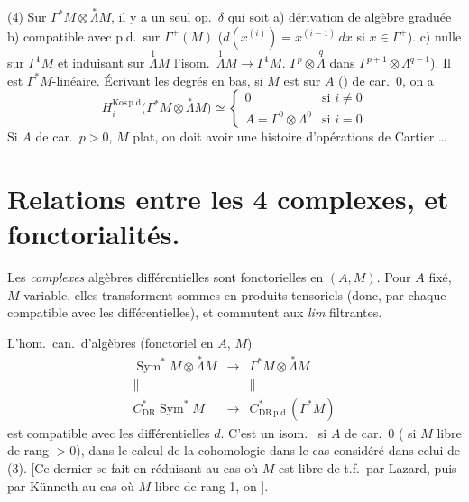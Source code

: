 \documentclass[11pt,a4paper]{article}
\begin{document}
(4) Sur $\Gamma^* M \otimes \overset{*}{\Lambda} M$, il y a un seul op.\ $\delta$ qui soit a) dérivation de algèbre graduée b) compatible avec p.d.\ sur $\Gamma^+(M)$ ($d(x^{(i)}) = x^{(i-1)}\, dx$ si $x \in \Gamma^+$). c) nulle sur $\Gamma^1 M$  et induisant sur $\overset{1}{\Lambda} M$ l'isom.\ $\overset{1}{\Lambda} M \to \Gamma^1 M$.    $\Gamma^p \otimes \overset{q}{\Lambda}$ dans $\Gamma^{p+1} \otimes \Lambda^{q-1}$). Il est $\Gamma^* M$-linéaire. Écrivant les degrés en bas, si $M$ est  \struck{\ill{}} sur $A$ () de car.\ $0$, on a
\[
  H_i^{\mathrm{Kos\,p.d}}\bigl( \Gamma^* M \otimes \overset{*}{\Lambda} M \bigr) \simeq
  \begin{cases}
    0 & \text{si } i \neq 0 \\
    A = \Gamma^0 \otimes \Lambda^0 & \text{si } i = 0
  \end{cases}
\]
Si $A$ de car.\ $p > 0$, $M$ plat, on doit avoir une histoire d'opérations de Cartier …

\section{Relations entre les 4 complexes, et fonctorialités.}

Les \emph{complexes} algèbres différentielles sont fonctorielles en $(A, M)$. Pour $A$ fixé, $M$ variable, elles transforment sommes en produits tensoriels (donc, par chaque  \ill{} compatible avec \struck{\ill{}} les différentielles), et commutent aux \emph{lim} filtrantes.

L'hom.\ can.\ d'algèbres (fonctoriel en $A$, $M$)
\[
  \begin{array}{ccc}
    \operatorname{Sym}^* M \otimes \overset{*}{\Lambda} M & \longrightarrow & \Gamma^* M \otimes \overset{*}{\Lambda} M \\
    \| & & \| \\
    C^*_{\mathrm{DR}} \operatorname{Sym}^* M & \longrightarrow & C^*_{\mathrm{DR\,p.d.}}(\Gamma^* M)
  \end{array}
\]
est compatible avec les différentielles $d$. \struck{\ill{}} C'est un isom.\  si $A$ de car.\ $0$ (  si $M$ libre de rang $> 0$), dans le calcul de la cohomologie dans le cas considéré dans celui de (3). [Ce dernier se fait en réduisant au cas où $M$ est libre de t.f.\ par Lazard, puis par Künneth au cas où $M$ libre de rang 1,  on  \ill{}].
\end{document}
